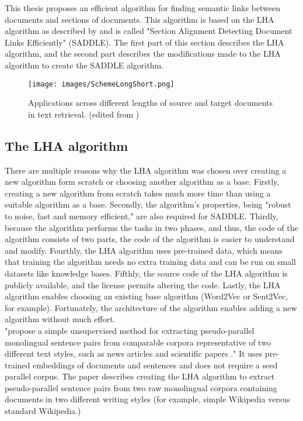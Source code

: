 This thesis proposes an efficient algorithm for finding semantic links between documents and sections of documents. This algorithm is based on the LHA algorithm as described by \citet{nikolov2018large} and is called "Section Alignment Detecting Document Links Efficiently" (SADDLE). The first part of this section describes the LHA algorithm, and the second part describes the modifications made to the LHA algorithm to create the SADDLE algorithm.


\begin{figure}[h]
\centering
\captionsetup{justification=centering}

\texttt{[image: images/SchemeLongShort.png]}
\caption{Applications across different lengths of source and target documents in text retrieval. (edited from \citep{jiang2019semantic}) }
\label{imgLongShort}
\end{figure}

\subsection{The LHA algorithm}
\label{subsecLHAAlgortithm}

There are multiple reasons why the LHA algorithm was chosen over creating a new algorithm form scratch or choosing another algorithm as a base. Firstly, creating a new algorithm from scratch takes much more time than using a suitable algorithm as a base. Secondly,  the algorithm's properties, being "robust to noise, fast and memory efficient," are also required for SADDLE. Thirdly, because the algorithm performs the tasks in two phases,  and thus, the code of the algorithm consists of two parts, the code of the algorithm is easier to understand and modify. Fourthly, the LHA algorithm uses pre-trained data, which means that training the algorithm needs no extra training data and can be run on small datasets like knowledge bases. Fifthly, the source code of the LHA algorithm is publicly available, and the license permits altering the code. Lastly, the LHA algorithm enables choosing an existing base algorithm (Word2Vec or Sent2Vec, for example). Fortunately, the architecture of the algorithm enables adding a new algorithm without much effort.\\

\citet{nikolov2018large} "propose a simple unsupervised method for extracting pseudo-parallel monolingual sentence pairs from comparable corpora representative of two different text styles, such as news articles and scientific papers ." It uses pre-trained embeddings of documents and sentences and does not require a seed parallel corpus. The paper describes creating the LHA algorithm to extract pseudo-parallel sentence pairs from two raw monolingual corpora containing documents in two different writing styles (for example, simple Wikipedia versus standard Wikipedia.) \\

